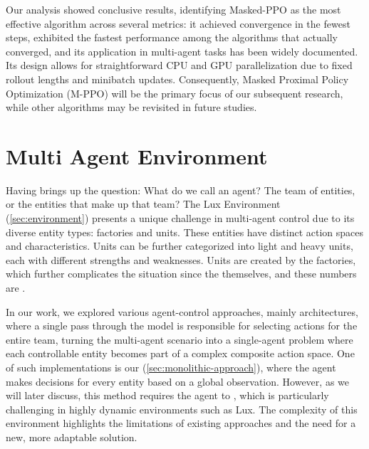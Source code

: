 \noindent Our analysis showed conclusive results, identifying Masked-PPO as the most effective algorithm across several metrics: it achieved convergence in the fewest steps, exhibited the fastest performance among the algorithms that actually converged, and its application in multi-agent tasks has been widely documented. Its design allows for straightforward CPU and GPU parallelization due to fixed rollout lengths and minibatch updates. Consequently, Masked Proximal Policy Optimization (M-PPO) will be the primary focus of our subsequent research, while other algorithms may be revisited in future studies.

\section{Multi Agent Environment}
\label{sec:multi-agent-environment}

\noindent Having  brings up the question: What do we call an agent? The team of entities, or the entities that make up that team? The Lux Environment (\autoref{sec:environment}) presents a unique challenge in multi-agent control due to its diverse entity types: factories and units. These entities have distinct action spaces and characteristics. Units can be further categorized into light and heavy units, each with different strengths and weaknesses. Units are created by the factories, which further complicates the situation since the  themselves, and these numbers are .

\bigskip

\noindent In our work, we explored various agent-control approaches, mainly  architectures, where a single pass through the model is responsible for selecting actions for the entire team, turning the multi-agent scenario into a single-agent problem where each controllable entity becomes part of a complex composite action space. One of such implementations is our  (\autoref{sec:monolithic-approach}), where the agent makes decisions for every entity based on a global observation. However, as we will later discuss, this method requires the agent to , which is particularly challenging in highly dynamic environments such as Lux. The complexity of this environment highlights the limitations of existing approaches and the need for a new, more adaptable solution.

